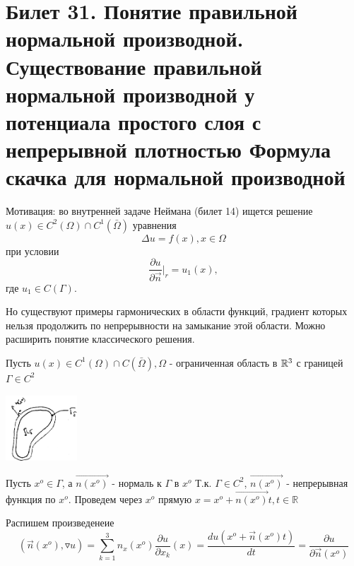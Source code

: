 \section{Билет 31.  Понятие правильной нормальной производной. Существование правильной нормальной производной у потенциала простого слоя с непрерывной плотностью Формула скачка для нормальной производной}
Мотивация: во внутренней задаче Неймана (билет 14) ищется решение $u(x) \in C^2(\Omega) \cap C^1(\bar{\Omega})$ уравнения $$\Delta u = f(x), x \in \Omega$$ при условии $$\frac{\partial u}{\partial \vec{n}}|_r = u_1(x),$$ где $u_1 \in C(\Gamma)$.

Но существуют примеры гармонических в области функций, градиент которых нельзя продолжить по непрерывности на замыкание этой области. Можно расширить понятие классического решения.

Пусть $u(x) \in C^1(\Omega) \cap C(\bar{\Omega}), \Omega$ - ограниченная область в $\mathbb{R}^3$ с границей $\Gamma \in C^2$
\begin{center}
\includegraphics[width=0.2\textwidth]{31_1_new}
\end{center}
Пусть $x^o \in \Gamma$, а $\vec{n(x^o)}$ - нормаль к $\Gamma$ в $x^o$ Т.к. $\Gamma \in C^2$, $\vec{n(x^o)}$ - непрерывная функция по $x^o$. Проведем через $x^o$ прямую $x = x^o + \vec{n(x^o)}t, t \in \mathbb{R}$

Распишем произведенеие $$(\vec{n}(x^o), \triangledown u) = \sum_{k=1}^{3} n_x(x^o)\frac{\partial u}{\partial x_k}(x) = \frac{du(x^o + \vec{n}(x^o)t)}{dt} = \frac{\partial u}{\partial \vec{n}(x^o)}$$

